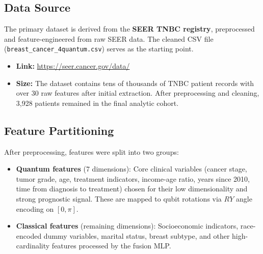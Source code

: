 \documentclass[12pt, letterpaper]{article}
\begin{document}
\subsection{Data Source}
The primary dataset is derived from the \textbf{SEER TNBC registry}, preprocessed and feature-engineered from raw SEER data. The cleaned CSV file (\texttt{breast\_cancer\_4quantum.csv}) serves as the starting point.

\begin{itemize}
    \item \textbf{Link:} \url{https://seer.cancer.gov/data/}
    \item \textbf{Size:} The dataset contains tens of thousands of TNBC patient records with over 30 raw features after initial extraction. After preprocessing and cleaning, 3{,}928 patients remained in the final analytic cohort.
\end{itemize}

\subsection{Feature Partitioning}
After preprocessing, features were split into two groups:
\begin{itemize}
    \item \textbf{Quantum features} (7 dimensions): Core clinical variables (cancer stage, tumor grade, age, treatment indicators, income-age ratio, years since 2010, time from diagnosis to treatment) chosen for their low dimensionality and strong prognostic signal. These are mapped to qubit rotations via $RY$ angle encoding on $[0, \pi]$.
    \item \textbf{Classical features} (remaining dimensions): Socioeconomic indicators, race-encoded dummy variables, marital status, breast subtype, and other high-cardinality features processed by the fusion MLP.
\end{itemize}
\end{document}
